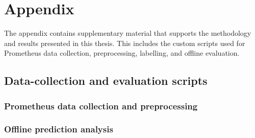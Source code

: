 \appendix

\chapter{Appendix}
\label{ch:appendix}

The appendix contains supplementary material that supports the
methodology and results presented in this thesis. This includes the
custom scripts used for Prometheus data collection, preprocessing,
labelling, and offline evaluation.

\section{Data-collection and evaluation scripts}
\label{app:scripts}

\subsection{Prometheus data collection and preprocessing}



\subsection{Offline prediction analysis}

